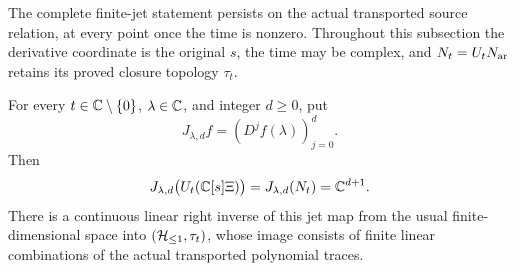 The complete finite-jet statement persists on the actual transported
source relation, at every point once the time is nonzero.
Throughout this subsection the derivative coordinate is the original
$s$, the time may be complex, and
$N_t=U_tN_{\rm ar}$ retains its proved closure topology $\tau_t$.

\begin{cqproposition}
\label{prop:cq-moving-finite-jets}
For every $t\in\mathbb C\setminus\{0\}$, $\lambda\in\mathbb C$, and
integer $d\ge0$, put
\[
 J_{\lambda,d}f=(D^jf(\lambda))_{j=0}^d.
\]
Then
\begin{equation}
 J_{\lambda,d}\bigl(U_t(\mathbb C[s]\Xi)\bigr)
   =J_{\lambda,d}(N_t)=\mathbb C^{d+1}.
 \label{eq:cq-moving-finite-jet-image}
\end{equation}
There is a continuous linear right inverse of this jet map from
the usual finite-dimensional space into $(\mathcal H_{\leq 1},\tau_t)$, whose
image consists of finite linear combinations of the actual
transported polynomial traces.
\end{cqproposition}

